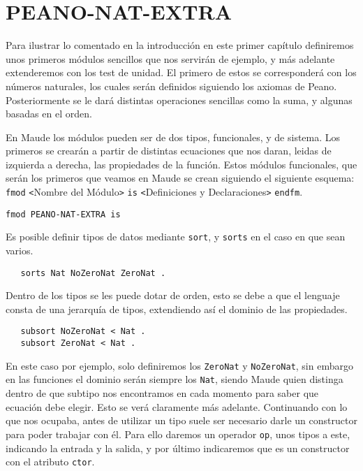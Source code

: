 
\section{PEANO-NAT-EXTRA}

Para ilustrar lo comentado en la introducción en este primer capítulo definiremos unos primeros módulos sencillos que nos servirán de ejemplo, y más adelante extenderemos con los test de unidad.
El primero de estos se corresponderá con los números naturales, los cuales serán definidos siguiendo los axiomas de Peano. Posteriormente se le dará distintas operaciones sencillas como la suma, y algunas basadas en el orden.\par

En Maude los módulos pueden ser de dos tipos, funcionales, y de sistema. Los primeros se crearán a partir de distintas ecuaciones que nos daran, leidas de izquierda a derecha, las propiedades de la función. Estos módulos funcionales, que serán los primeros que veamos en Maude se crean siguiendo el siguiente esquema: \texttt{fmod} \verb"<"Nombre del Módulo\verb">" \texttt{is} \verb"<"Definiciones y Declaraciones\verb">" \texttt{endfm}.\par

{\codesize
\begin{verbatim}
fmod PEANO-NAT-EXTRA is
\end{verbatim}
}

Es posible definir tipos de datos mediante \texttt{sort}, y \texttt{sorts} en el caso en que sean varios. \par

{\codesize
\begin{verbatim}
   sorts Nat NoZeroNat ZeroNat .
\end{verbatim}
}

Dentro de los tipos se les puede dotar de orden, esto se debe a que el lenguaje consta de una jerarquía de tipos, extendiendo así el dominio de las propiedades. \par

{\codesize
\begin{verbatim}
   subsort NoZeroNat < Nat .
   subsort ZeroNat < Nat .
\end{verbatim}
}

En este caso por ejemplo, solo definiremos los \texttt{ZeroNat} y \texttt{NoZeroNat}, sin embargo en las funciones el dominio serán siempre los \texttt{Nat}, siendo Maude quien distinga dentro de que subtipo nos encontramos en cada momento para saber que ecuación debe elegir. Esto se verá claramente más adelante. Continuando con lo que nos ocupaba, antes de utilizar un tipo suele ser necesario darle un constructor para poder trabajar con él. Para ello daremos un operador \texttt{op}, unos tipos a este, indicando la entrada y la salida, y por último indicaremos que es un constructor con el atributo \texttt{ctor}. \par

